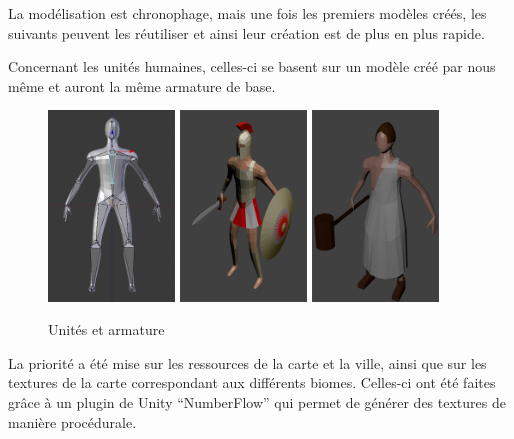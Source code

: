\documentclass[12pt]{report}
\begin{document}
La modélisation est chronophage, mais une fois les premiers modèles créés, les suivants peuvent les réutiliser et ainsi leur création est de plus en plus rapide.

Concernant les unités humaines, celles-ci se basent sur un modèle créé par nous même et auront la même armature de base.

\begin{figure}[H]
    \centering
    \includegraphics[width=0.3\textwidth]{RefUnitWthArmature}
    \includegraphics[width=0.3\textwidth]{Swordmen}
    \includegraphics[width=0.3\textwidth]{Worker}
    \caption{Unités et armature}
\end{figure}

La priorité a été mise sur les ressources de la carte et la ville, ainsi que sur les textures de la carte correspondant aux différents biomes. Celles-ci ont été faites grâce à un plugin de Unity “NumberFlow” qui permet de générer des textures de manière procédurale.
\end{document}
